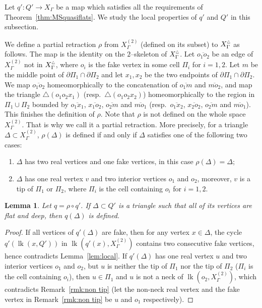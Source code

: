 \documentclass[11pt]{amsart}
\newcommand{\lk}{\operatorname{lk}}
\newtheorem{lemma}[theorem]{Lemma}
\theoremstyle{definition}
\newcommand{\Xb}{X^{\scalebox{0.53}{$\triangle$}}}
\begin{document}
Let $q'\colon Q'\to X_\Gamma$ be a map which satisfies all the requirements of Theorem~\ref{thm:MSquasiflats}. We study the local properties of $q'$ and $Q'$ in this subsection.

We define a partial retraction $\rho$ from $X^{(2)}_\Gamma$ (defined on its subset) to $\Xb_\Gamma$ as follows. The map is the identity on the $2$--skeleton of $\Xb_\Gamma$. Let $\overline{o_1o_2}$ be an edge of $X^{(2)}_\Gamma$ not in $\Xb_\Gamma$, where $o_i$ is the fake vertex in some cell $\Pi_i$ for $i=1,2$. Let $m$ be the middle point of $\partial\Pi_1\cap\partial\Pi_2$ and let $x_1,x_2$ be the two endpoints of $\partial\Pi_1\cap\partial\Pi_2$. We map $\overline{o_1o_2}$ homeomorphically to the concatenation of $\overline{o_1m}$ and $\overline{mo_2}$, and map the triangle $\triangle(o_1o_2x_1)$ (resp.\ $\triangle(o_1o_2x_2)$) homeomorphically to the region in $\Pi_1\cup\Pi_2$ bounded by $\overline{o_1x_1}$, $\overline{x_1o_2}$, $\overline{o_2m}$ and $\overline{mo_1}$ (resp.\ $\overline{o_1x_2}$, $\overline{x_2o_2}$, $\overline{o_2m}$ and $\overline{mo_1}$). This finishes the definition of $\rho$. Note that $\rho$ is not defined on the whole space $X^{(2)}_\Gamma$. That is why we call it a partial retraction. More precisely, for a triangle $\Delta\subset X^{(2)}_\Gamma$, $\rho(\Delta)$ is defined if and only if $\Delta$ satisfies one of the following two cases:
\begin{enumerate}
	\item $\Delta$ has two real vertices and one fake vertices, in this case $\rho(\Delta)=\Delta$;
	\item $\Delta$ has one real vertex $v$ and two interior vertices $o_1$ and $o_2$, moreover, $v$ is a tip of $\Pi_1$ or $\Pi_2$, where $\Pi_i$ is the cell containing $o_i$ for $i=1,2$.
\end{enumerate}

\begin{lemma}
	\label{lem:well-defined}
Let $q=\rho\circ q'$. If $\Delta\subset Q'$ is a triangle such that all of its vertices are flat and deep, then $q(\Delta)$ is defined. 
\end{lemma}

\begin{proof}
If all vertices of $q'(\Delta)$ are fake, then for any vertex $x\in\Delta$, the cycle $q'(\lk(x,Q'))$ in $\lk(q'(x),X^{(2)}_\Gamma)$ contains two consecutive fake vertices, hence contradicts Lemma~\ref{lem:local}. If $q'(\Delta)$ has one real vertex $u$ and two interior vertices $o_1$ and $o_2$, but $u$ is neither the tip of $\Pi_1$ nor the tip of $\Pi_2$ ($\Pi_i$ is the cell containing $o_i$), then $u\in \Pi_1$ and $u$ is not a neck of $\lk(o_2,X^{(2)}_\Gamma)$, which contradicts Remark~\ref{rmk:non tip} (let the non-neck real vertex and the fake vertex in Remark~\ref{rmk:non tip} be $u$ and $o_1$ respectively).
\end{proof}
\end{document}
